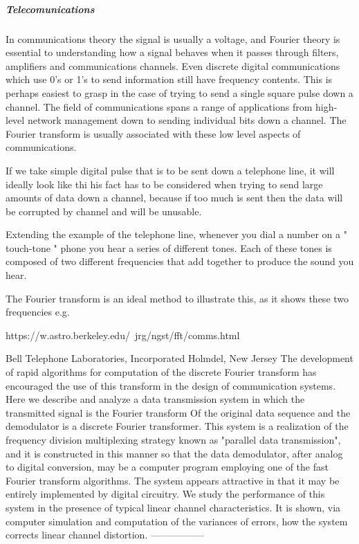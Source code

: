 \documentclass[ams,fleqn,amsmath,amssymb]{article}
\begin{document}
\begin{}
  \subparagraph*{Telecomunications}
  
  In communications theory the signal is usually a voltage, and Fourier theory is essential to understanding how a signal behaves when it passes through filters, amplifiers and communications channels. Even discrete digital communications which use 0's or 1's to send information still have frequency contents. This is perhaps easiest to grasp in the case of trying to send a single square pulse down a channel.
  The field of communications spans a range of applications from high-level network management down to sending individual bits down a channel. The Fourier transform is usually associated with these low level aspects of communications.
  
  If we take simple digital pulse that is to be sent down a telephone line, it will ideally look like thi
  his fact has to be considered when trying to send large amounts of data down a channel, because if too much is sent then the data will be corrupted by channel and will be unusable.
  
  Extending the example of the telephone line, whenever you dial a number on a " touch-tone " phone you hear a series of different tones. Each of these tones is composed of two different frequencies that add together to produce the sound you hear.
  
  The Fourier transform is an ideal method to illustrate this, as it shows these two frequencies e.g.
  
  https://w.astro.berkeley.edu/~jrg/ngst/fft/comms.html
  
  Bell Telephone Laboratories, Incorporated
  Holmdel, New Jersey
  The development of rapid algorithms for computation
  of the discrete Fourier transform has encouraged the use of
  this transform in the design of communication systems. Here
  we describe and analyze a data transmission system in which
  the transmitted signal is the Fourier transform Of the original
  data sequence and the demodulator is a discrete Fourier transformer. This system is a realization of the frequency division
  multiplexing strategy known as "parallel data transmission",
  and it is constructed in this manner so that the data demodulator, after analog to digital conversion, may be a computer
  program employing one of the fast Fourier transform algorithms.
  The system appears attractive in that it may be entirely
  implemented by digital circuitry. We study the performance
  of this system in the presence of typical linear channel characteristics. It is shown, via computer simulation and computation
  of the variances of errors, how the system corrects linear
  channel distortion.
  -----------------
  

\end{}
\end{document}
